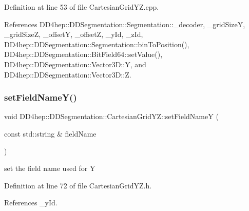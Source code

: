 Definition at line 53 of file Cartesian\+Grid\+Y\+Z.\+cpp.



References D\+D4hep\+::\+D\+D\+Segmentation\+::\+Segmentation\+::\+\_\+decoder, \+\_\+grid\+SizeY, \+\_\+grid\+SizeZ, \+\_\+offsetY, \+\_\+offsetZ, \+\_\+y\+Id, \+\_\+z\+Id, D\+D4hep\+::\+D\+D\+Segmentation\+::\+Segmentation\+::bin\+To\+Position(), D\+D4hep\+::\+D\+D\+Segmentation\+::\+Bit\+Field64\+::set\+Value(), D\+D4hep\+::\+D\+D\+Segmentation\+::\+Vector3\+D\+::Y, and D\+D4hep\+::\+D\+D\+Segmentation\+::\+Vector3\+D\+::Z.

\hypertarget{class_d_d4hep_1_1_d_d_segmentation_1_1_cartesian_grid_y_z_abd0b24749554d02acb6fb5ffa5e15335}{}\label{class_d_d4hep_1_1_d_d_segmentation_1_1_cartesian_grid_y_z_abd0b24749554d02acb6fb5ffa5e15335} 
\subsubsection{\texorpdfstring{set\+Field\+Name\+Y()}{setFieldNameY()}}
{\footnotesize\ttfamily void D\+D4hep\+::\+D\+D\+Segmentation\+::\+Cartesian\+Grid\+Y\+Z\+::set\+Field\+NameY (\begin{DoxyParamCaption}\item[{const std\+::string \&}]{field\+Name }\end{DoxyParamCaption})\hspace{0.3cm}{\ttfamily [inline]}}



set the field name used for Y 



Definition at line 72 of file Cartesian\+Grid\+Y\+Z.\+h.



References \+\_\+y\+Id.

\hypertarget{class_d_d4hep_1_1_d_d_segmentation_1_1_cartesian_grid_y_z_ad6d2428895d3f1842bd4d6add72658d2}{}\label{class_d_d4hep_1_1_d_d_segmentation_1_1_cartesian_grid_y_z_ad6d2428895d3f1842bd4d6add72658d2} 
